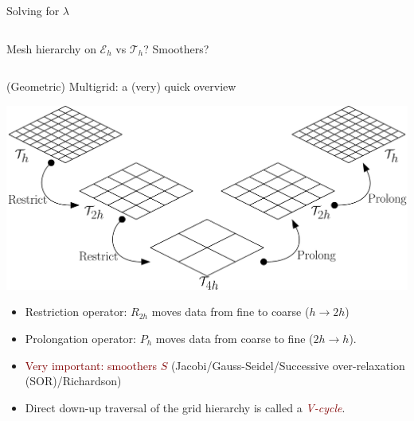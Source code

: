 \documentclass[9pt]{beamer}
\begin{document}
\begin{frame}[c]{Solving for $\lambda$}
\begin{columns}
\begin{column}{0.5\textwidth}
\begin{center}
	\end{center}
	Mesh hierarchy on $\mathcal{E}_h$ vs $\mathcal{T}_h$? Smoothers?
	\end{column}
\end{columns}
\end{frame}

\begin{frame}[c]{(Geometric) Multigrid: a (very) quick overview}
	\begin{center}
		\includegraphics[width=\linewidth]{figures/multigrid}
	\end{center}
\vspace{-10pt}\begin{itemize}
		\item Restriction operator: $R_{2h}$ moves data from
		fine to coarse ($h \rightarrow 2h$)
		\item Prolongation operator: $P_{h}$ moves data from coarse to fine ($2h \rightarrow h$).
		\item \textcolor{maroon}{Very important: smoothers $S$}
		(Jacobi/Gauss-Seidel/Successive over-relaxation (SOR)/Richardson)
		\item Direct down-up traversal of the grid hierarchy is
		called a \textcolor{maroon}{\emph{V-cycle}}.
	\end{itemize}
\end{frame}
\end{document}
